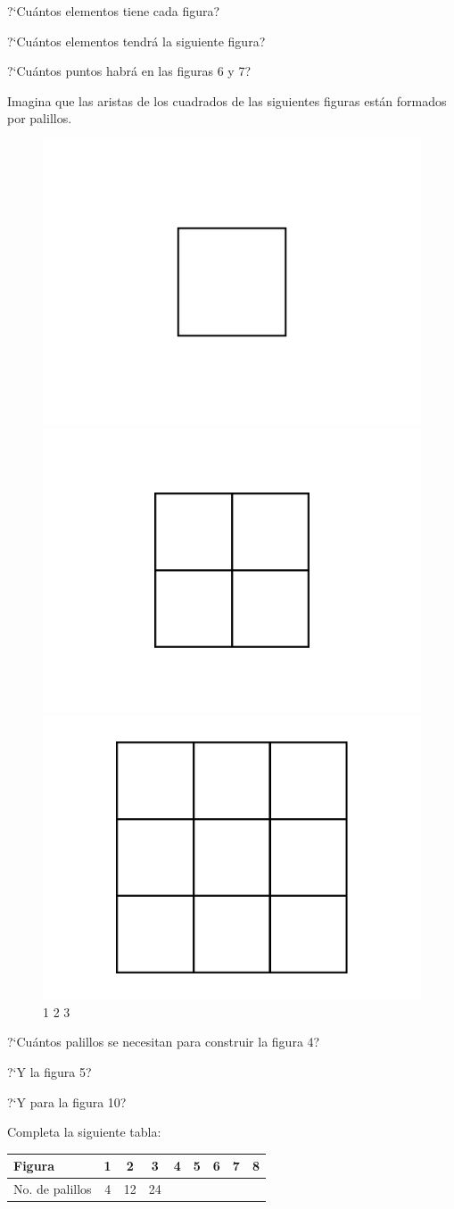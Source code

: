\documentclass[11pt]{article}
\begin{document}
?`Cu\'antos elementos tiene cada figura?

?`Cu\'antos elementos tendr\'a la siguiente figura?

?`Cu\'antos puntos habr\'a en las figuras 6 y 7?

\vspace{1cm}

Imagina que las aristas de los cuadrados de las siguientes figuras est\'an
formados por palillos. 

\begin{figure}[h]
    \centering
    \includegraphics[width=0.2\linewidth]{figures/figures007.png}
    \includegraphics[width=0.2\linewidth]{figures/figures008.png}
    \includegraphics[width=0.2\linewidth]{figures/figures009.png}\\
    1 \hspace{3cm} 2 \hspace{3cm} 3
\end{figure}

?`Cu\'antos palillos se necesitan para construir la figura 4?

?`Y la figura 5?

?`Y para la figura 10?

Completa la siguiente tabla:

\begin{center}
\begin{tabular}{|l|c|c|c|c|c|c|c|c|}
\hline
Figura &\hspace{5mm}1\hspace{5mm} & \hspace{5mm}2\hspace{5mm} & \hspace{5mm}3\hspace{5mm} & \hspace{5mm}4\hspace{5mm} & \hspace{5mm}5\hspace{5mm} & \hspace{5mm}6\hspace{5mm} & \hspace{5mm}7\hspace{5mm} & \hspace{5mm}8\hspace{5mm}   \\
\hline
\hline
No. de palillos & 4 & 12 & 24 & &&&&\\ 
\hline
\end{tabular}
\end{center}
\end{document}
